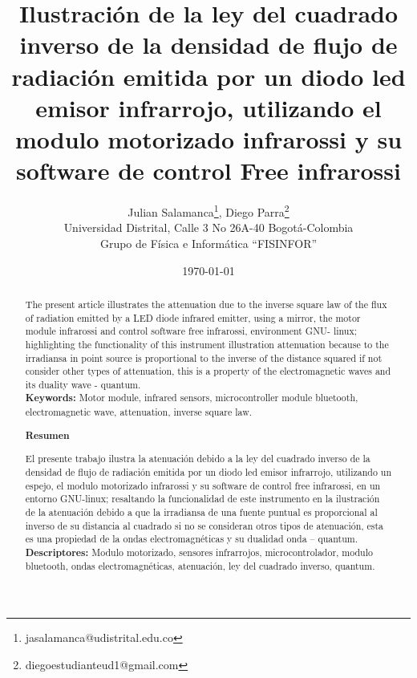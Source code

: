 \documentclass[12]{article}
\title{\bf{Ilustración de la ley del cuadrado inverso de la densidad de flujo de radiación emitida por un diodo led emisor infrarrojo, utilizando el modulo motorizado infrarossi y su software de control Free infrarossi}}
\author{Julian Salamanca\footnote{jasalamanca@udistrital.edu.co}, Diego Parra\footnote{diegoestudianteud1@gmail.com} \\
  Universidad Distrital, Calle 3 No 26A-40 Bogotá-Colombia\\
  Grupo de Física e Informática ``FISINFOR''
}
\date{\today}
\def\tablename{Tabla}%
\begin{document}
\renewcommand{\tablename}{Tabla}
\maketitle
\vspace{-0.8cm}
\begin{abstract}
The present article illustrates the attenuation due to the inverse square law of the flux of radiation emitted by a LED diode infrared emitter, using a mirror, the motor module  infrarossi and control software free infrarossi, environment GNU- linux; highlighting the functionality of this instrument  illustration attenuation because to the irradiansa in point source is proportional to the inverse of the distance squared if not consider other types of attenuation, this is a property of the electromagnetic waves and its duality wave - quantum.\\
{\bf{Keywords:}} Motor module, infrared sensors, microcontroller module bluetooth, electromagnetic wave, attenuation, inverse square law.
\begin{center}
{\bf{Resumen}} 
\end{center}
El presente trabajo ilustra la atenuación debido a la ley del cuadrado inverso de la densidad de flujo de radiación emitida por un diodo led emisor infrarrojo, utilizando un espejo, el modulo motorizado  infrarossi y su software de control free infrarossi, en un entorno GNU-linux; resaltando la funcionalidad de este instrumento en la ilustración de la atenuación debido a que la irradiansa de una fuente puntual es proporcional al inverso de su distancia al cuadrado si no se consideran otros tipos de atenuación, esta es una  propiedad de la ondas electromagnéticas y su dualidad onda – quantum. \\
{\bf{Descriptores:}} Modulo motorizado, sensores infrarrojos, microcontrolador, modulo bluetooth, ondas electromagnéticas, atenuación, ley del cuadrado inverso, quantum. 
\end{abstract}
\end{document}
